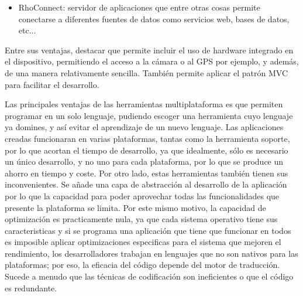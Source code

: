 \documentclass[
10pt, %
a4paper, %
oneside, %
headinclude,footinclude, %
BCOR5mm, %
]{scrartcl}
\begin{document}
\begin{itemize}
\begin{itemize}
		\item RhoConnect: servidor de aplicaciones que entre otras cosas permite conectarse a diferentes fuentes de datos como servicios web, bases de datos, etc...

	\end{itemize}
	Entre sus ventajas, destacar que permite incluir el uso de hardware integrado en el dispositivo, permitiendo el acceso a la cámara o al GPS por ejemplo, y además, de una manera relativamente sencilla. También permite aplicar el patrón MVC para facilitar el desarrollo.
\end{itemize} 

Las principales ventajas de las herramientas multiplataforma es que permiten programar en un solo lenguaje, pudiendo escoger una herramienta cuyo lenguaje ya domines, y así evitar el aprendizaje de un nuevo lenguaje. Las aplicaciones creadas funcionaran en varias plataformas, tantas como la herramienta soporte, por lo que acortan el tiempo de desarrollo, ya que idealmente, sólo es necesario un único desarrollo, y no uno para cada plataforma, por lo que se produce un ahorro en tiempo y coste. Por otro lado, estas herramientas también tienen sus inconvenientes. Se añade una capa de abstracción al desarrollo de la aplicación por lo que la capacidad para poder aprovechar todas las funcionalidades que presente la plataforma se limita. Por este mismo motivo, la capacidad de optimización es practicamente nula, ya que cada sistema operativo tiene sus caracteristicas y si se programa una aplicación que tiene que funcionar en todos es imposible aplicar optimizaciones especificas para el sistema que mejoren el rendimiento, los desarrolladores trabajan en lenguajes que no son nativos para las plataformas; por eso, la eficacia del código depende del motor de traducción. Sucede a menudo que las técnicas de codificación son ineficientes o que el código es redundante.
\end{document}
